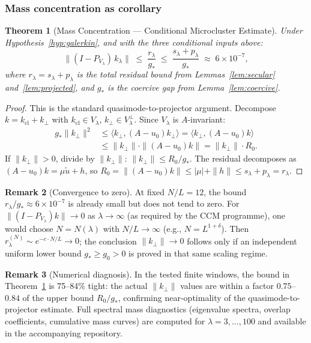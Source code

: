\documentclass[11pt,a4paper]{article}
\theoremstyle{plain}
\newtheorem{theorem}{Theorem}[section]
\theoremstyle{definition}
\newtheorem{remark}[theorem]{Remark}
\begin{document}
\subsubsection{Mass concentration as corollary}

\begin{theorem}[Mass Concentration --- Conditional Microcluster Estimate]
\label{thm:mass-concentration}
Under Hypothesis~\ref{hyp:galerkin}, and with the three conditional
inputs above:
\[
  \|(I - P_{V_\lambda})\, k_\lambda\|
  \;\leq\; \frac{r_\lambda}{g_*}
  \;\leq\; \frac{s_\lambda + p_\lambda}{g_*}
  \;\approx\; 6 \times 10^{-7},
\]
where $r_\lambda = s_\lambda + p_\lambda$ is the total residual
bound from Lemmas~\ref{lem:secular} and~\ref{lem:projected}, and
$g_*$ is the coercive gap from Lemma~\ref{lem:coercive}.
\end{theorem}

\begin{proof}
This is the standard quasimode-to-projector argument.  Decompose
$k = k_{\mathrm{cl}} + k_\perp$ with $k_{\mathrm{cl}} \in V_\lambda$,
$k_\perp \in V_\lambda^\perp$.  Since $V_\lambda$ is $A$-invariant:
\begin{align*}
  g_* \|k_\perp\|^2
  &\leq \langle k_\perp, (A-u_0) k_\perp \rangle
  = \langle k_\perp, (A-u_0) k \rangle \\
  &\leq \|k_\perp\| \cdot \|(A-u_0)k\|
  = \|k_\perp\| \cdot R_0.
\end{align*}
If $\|k_\perp\| > 0$, divide by $\|k_\perp\|$:
$\|k_\perp\| \leq R_0/g_*$.  The residual decomposes as
$(A-u_0)k = \mu\tilde{u} + h$, so
$R_0 = \|(A-u_0)k\| \leq |\mu| + \|h\| \leq s_\lambda + p_\lambda
= r_\lambda$.
\end{proof}

\begin{remark}[Convergence to zero]
At fixed $N/L = 12$, the bound $r_\lambda/g_* \approx 6 \times
10^{-7}$ is already small but does not tend to zero.  For
$\|(I-P_{V_\lambda})k\| \to 0$ as $\lambda \to \infty$ (as required
by the CCM programme), one would choose $N = N(\lambda)$ with
$N/L \to \infty$ (e.g., $N = L^{1+\delta}$).  Then
$r_\lambda^{(N)} \sim e^{-c \cdot N/L} \to 0$; the conclusion
$\|k_\perp\| \to 0$ follows only if an independent uniform lower bound
$g_* \geq g_0 > 0$ is proved in that same scaling regime.
\end{remark}

\begin{remark}[Numerical diagnosis]
In the tested finite windows, the bound in
Theorem~\ref{thm:mass-concentration} is 75--84\% tight:
the actual $\|k_\perp\|$ values are within a factor $0.75$--$0.84$
of the upper bound $R_0/g_*$, confirming near-optimality of the
quasimode-to-projector estimate.  Full spectral mass diagnostics
(eigenvalue spectra, overlap coefficients, cumulative mass curves)
are computed for $\lambda = 3, \ldots, 100$ and available in the
accompanying repository.
\end{remark}
\end{document}
